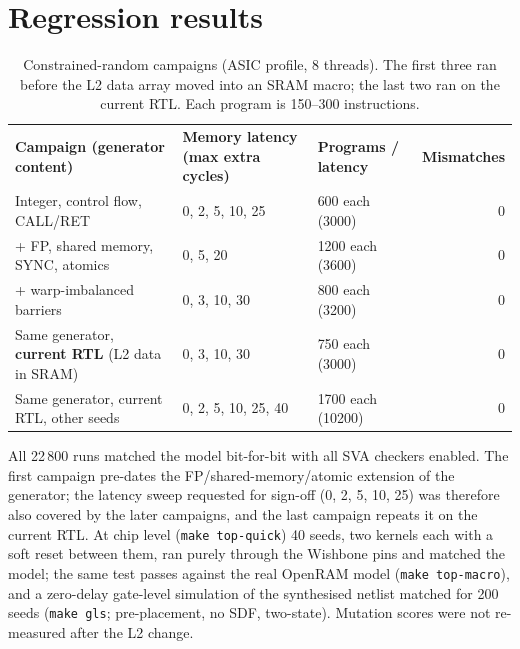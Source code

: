 \documentclass[10pt,a4paper]{report}
\newcommand{\rowcol}{\rowcolors{2}{rowgray}{white}}
\newcommand{\tblhead}[1]{\cellcolor{hdrgray}\sffamily\bfseries #1}
\begin{document}
\section{Regression results}
\begin{table}[ht]\centering\rowcol
\begin{tabular}{@{}p{5.9cm}p{4.7cm}p{3.4cm}r@{}}
\tblhead{Campaign (generator content)} & \tblhead{Memory latency (max extra cycles)} & \tblhead{Programs / latency} & \tblhead{Mismatches}\\
Integer, control flow, CALL/RET & 0, 2, 5, 10, 25 & 600 each (3000) & 0\\
+ FP, shared memory, SYNC, atomics & 0, 5, 20 & 1200 each (3600) & 0\\
+ warp-imbalanced barriers & 0, 3, 10, 30 & 800 each (3200) & 0\\
Same generator, \textbf{current RTL} (L2 data in SRAM) & 0, 3, 10, 30 & 750 each (3000) & 0\\
Same generator, current RTL, other seeds & 0, 2, 5, 10, 25, 40 & 1700 each (10200) & 0\\
\bottomrule
\end{tabular}
\caption{Constrained-random campaigns (ASIC profile, 8 threads). The first three ran before the L2 data array moved into an SRAM macro; the last two ran on the current RTL. Each program is 150--300 instructions.}
\end{table}
All 22\,800 runs matched the model bit-for-bit with all SVA checkers enabled. The first campaign pre-dates the FP/shared-memory/atomic extension of the generator;
the latency sweep requested for sign-off (0, 2, 5, 10, 25) was therefore also covered by the later campaigns, and the last campaign repeats it on the current RTL.
At chip level (\texttt{make top-quick}) 40 seeds, two kernels each with a soft reset between them, ran purely through the Wishbone pins and matched the model; the same test passes against the real OpenRAM model (\texttt{make top-macro}),
and a zero-delay gate-level simulation of the synthesised netlist matched for 200 seeds (\texttt{make gls}; pre-placement, no SDF, two-state). Mutation scores were not re-measured after the L2 change.
\end{document}
